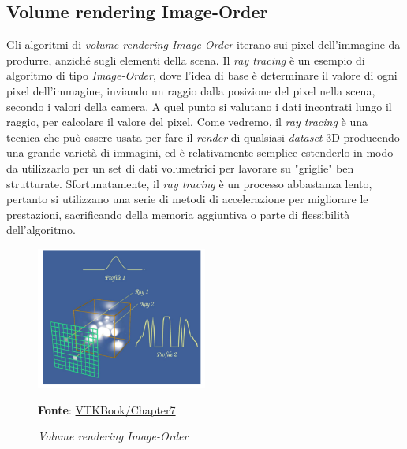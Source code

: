 \subsection{Volume rendering Image-Order}\label{sec:volume-image-order}
Gli algoritmi di \emph{volume rendering Image-Order} iterano sui pixel dell'immagine da produrre, anziché sugli elementi della scena. Il \emph{ray tracing} è un esempio di algoritmo di tipo \emph{Image-Order}, dove l'idea di base è determinare il valore di ogni pixel dell'immagine, inviando un raggio dalla posizione del pixel nella scena, secondo i valori della camera. A quel punto si  valutano i dati incontrati lungo il raggio, per calcolare il valore del pixel. Come vedremo, il \emph{ray tracing} è una tecnica che può essere usata per fare il \emph{render} di qualsiasi \emph{dataset} 3D producendo una grande varietà di immagini, ed è relativamente semplice estenderlo in modo da utilizzarlo per un set di dati volumetrici per lavorare su "griglie" ben strutturate. Sfortunatamente, il \emph{ray tracing} è un processo abbastanza lento, pertanto si utilizzano una serie di metodi di accelerazione per migliorare le prestazioni, sacrificando della memoria aggiuntiva o parte di flessibilità dell'algoritmo.

\begin{figure}[h]
    \centering
    \includegraphics[width=0.5\textwidth]{immagini/volumerendering/imageorder.png}
    \caption{\textit{Volume rendering Image-Order}}
    \textbf{Fonte}: \href{https://lorensen.github.io/VTKExamples/site/VTKBook/07Chapter7/}{VTKBook/Chapter7}
    \label{fig: Volume Rendering Image-Order}
\end{figure}

